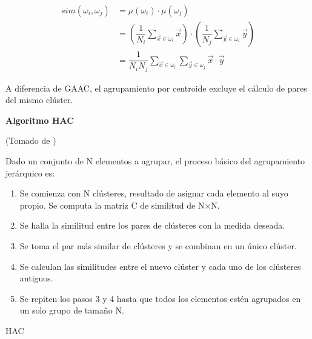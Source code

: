 \documentclass{llncs}
\DeclareMathOperator*{\argmax}{arg\,max}
\begin{document}
\begin{itemize}
		\begin{align}
			sim(\omega_{i}, \omega_{j}) &= \mu(\omega_{i})\cdot\mu(\omega_{j}) \nonumber\\
			&= \left(\dfrac{1}{N_{i}}\sum_{\overrightarrow{x} \in \omega_{i}}\overrightarrow{x}\right) \cdot \left(\dfrac{1}{N_{j}}\sum_{\overrightarrow{y} \in \omega_{i}}\overrightarrow{y}\right) \nonumber\\
			& = \dfrac{1}{N_{i}N_{j}} \sum_{\overrightarrow{x} \in \omega_{i}}\sum_{\overrightarrow{y} \in \omega_{j}}\overrightarrow{x}\cdot\overrightarrow{y} \nonumber
		\end{align}
	
	A diferencia de GAAC, el agrupamiento por centroide excluye el c\'alculo de pares del mismo cl\'uster.
\end{itemize}

\vspace{1em}
\textbf{Algoritmo HAC}
\begin{flushright}
	\scriptsize*(Tomado de \cite{B1})
	\normalsize
\end{flushright}

Dado un conjunto de N elementos a agrupar, el proceso básico del agrupamiento jerárquico es:
\begin{enumerate}
	\item Se comienza con N cl\'usteres, resultado de asignar cada elemento al suyo propio. Se computa la matriz C de similitud de N×N.
	
	\item Se halla la similitud entre los pares de cl\'usteres con la medida deseada.
	
	\item Se toma el par más similar de clústeres y se combinan en un único clúster.
	
	\item Se calculan las similitudes entre el nuevo clúster y cada uno de los cl\'usteres antiguos.
	
	\item Se repiten los pasos 3 y 4 hasta que todos los elementos estén agrupados en un solo grupo de tamaño N.
\end{enumerate}

\begin{algorithm}
	\caption{HAC}
	\begin{algorithmic}[1]
		\EndFor
		\EndFor
		\State{$ <i,m> \leftarrow \argmax_{<i,m>:i \neq \wedge I[i] = 1 \wedge I[m] = 1} C[i][m] $}
		\EndFor
		\EndFor
	\end{algorithmic}
\end{algorithm}
\end{document}
